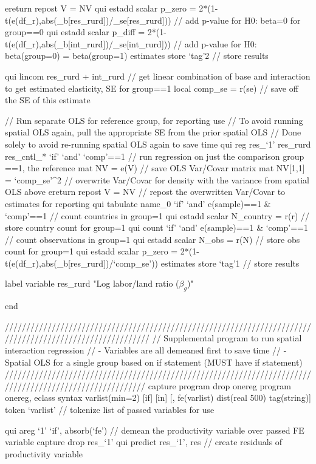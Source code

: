 	ereturn repost V = NV
	qui estadd scalar p_zero = 2*(1-t(e(df_r),abs(_b[res_rurd])/_se[res_rurd])) // add p-value for H0: beta=0 for group==0		
	qui estadd scalar p_diff = 2*(1-t(e(df_r),abs(_b[int_rurd])/_se[int_rurd])) // add p-value for H0: beta(group=0) = beta(group=1)
	estimates store `tag'2 // store results

	qui lincom res_rurd + int_rurd // get linear combination of base and interaction to get estimated elasticity, SE for group==1	
	local comp_se = r(se) // save off the SE of this estimate
	
	// Run separate OLS for reference group, for reporting use
	// To avoid running spatial OLS again, pull the appropriate SE from the prior spatial OLS
	// Done solely to avoid re-running spatial OLS again to save time
	qui reg res_`1' res_rurd res_cntl_* `if' `and' `comp'==1 // run regression on just the comparison group ==1, the reference
	mat NV = e(V) // save OLS Var/Covar matrix
	mat NV[1,1] = `comp_se'^2 // overwrite Var/Covar for density with the variance from spatial OLS above
	ereturn repost V = NV // repost the overwritten Var/Covar to estimates for reporting
	qui tabulate name_0 `if' `and' e(sample)==1 & `comp'==1 // count countries in group=1
	qui estadd scalar N_country = r(r) // store country count for group=1
	qui count `if' `and' e(sample)==1 & `comp'==1 // count observations in group=1	
	qui estadd scalar N_obs = r(N) // store obs count for group=1
	qui estadd scalar p_zero = 2*(1-t(e(df_r),abs(_b[res_rurd])/`comp_se'))
	estimates store `tag'1 // store results
	
	label variable res_rurd "Log labor/land ratio ($\beta_g$)"


end 

//////////////////////////////////////////////////////////////////////////////////////////////////////////
// Supplemental program to run spatial interaction regression
// - Variables are all demeaned first to save time
// - Spatial OLS for a single group based on if statement (MUST have if statement)
/////////////////////////////////////////////////////////////////////////////////////////////////////////
capture program drop onereg
program onereg, eclass
	syntax varlist(min=2) [if] [in] [, fe(varlist) dist(real 500) tag(string)] 
	token `varlist' // tokenize list of passed variables for use
		
	qui areg `1' `if', absorb(`fe') // demean the productivity variable over passed FE variable
	capture drop res_`1'
	qui predict res_`1', res // create residuals of productivity variable
	
